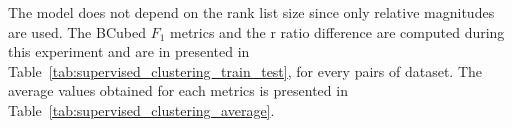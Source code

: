 The model does not depend on the rank list size since only relative magnitudes are used.
The BCubed $F_1$ metrics and the r ratio difference are computed during this experiment and are in presented in Table~\ref{tab:supervised_clustering_train_test}, for every pairs of dataset.
The average values obtained for each metrics is presented in Table~\ref{tab:supervised_clustering_average}.


